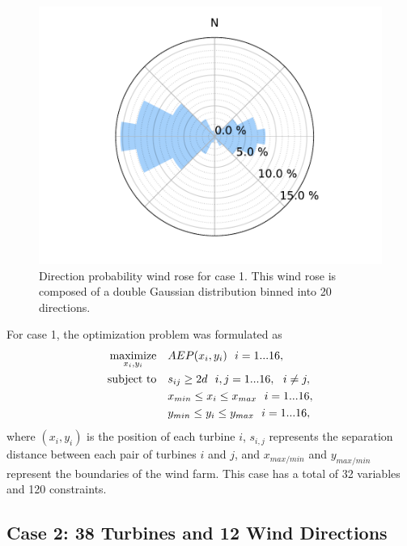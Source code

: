\documentclass[hidelinks,sort&compress,AMA,STIX1COL]{WileyNJD-v2}
\providecommand{\DIFaddbeginFL}{} %
\providecommand{\DIFaddendFL}{} %
\providecommand{\DIFdelendFL}{} %
\newcommand{\DIFaddincludegraphics}[2][]{{\color{blue}\fbox{\DIFOincludegraphics[#1]{#2}}}} %
\DeclareRobustCommand{\DIFaddbeginFL}{\DIFOaddbeginFL \let\includegraphics\DIFaddincludegraphics} %
\DeclareRobustCommand{\DIFaddendFL}{\DIFOaddendFL \let\includegraphics\DIFOincludegraphics} %
\DeclareRobustCommand{\DIFdelendFL}{\DIFOaddendFL \let\includegraphics\DIFOincludegraphics} %
\begin{document}
\begin{figure}[h!]
\begin{minipage}[t]{18pc}
\DIFdelendFL \DIFaddbeginFL \includegraphics[width=\textwidth, trim={2.0cm 0cm 2.0cm 0cm}, clip]{final_images/windroses/Figure_9.pdf}
\DIFaddendFL \caption{Direction probability wind rose for case 1. This wind rose is composed of a double Gaussian distribution binned into 20 directions.}
\label{fig:directional}
\end{minipage} 
\end{figure}
%

For case 1, the optimization problem was formulated as
%
\begin{equation}
	\label{eqn:opt1}
	\begin{aligned} [b]
	\underset{x_i,y_i}{\textrm{maximize}} \quad & AEP(x_i,y_i)~~i=1...16,\\
	\textrm{subject to} \quad & s_{ij} \geq 2\*d~~i,j=1...16,~~i \neq j,\\
	 & x_{min} \leq x_i \leq x_{max}~~i=1...16,\\
     & y_{min} \leq y_i \leq y_{max}~~i=1...16,
	\end{aligned}
\end{equation}
%
%
where $(x_i,y_i)$ is the position of each turbine $i$, $s_{i,j}$ represents the separation distance between each pair of turbines $i$ and $j$, and $x_{max/min}$ and $y_{max/min}$ represent the boundaries of the wind farm. This case has a total of 32 variables and 120 constraints.

\subsection{Case 2: 38 Turbines and 12 Wind Directions}\label{sec:case2}
\end{document}
